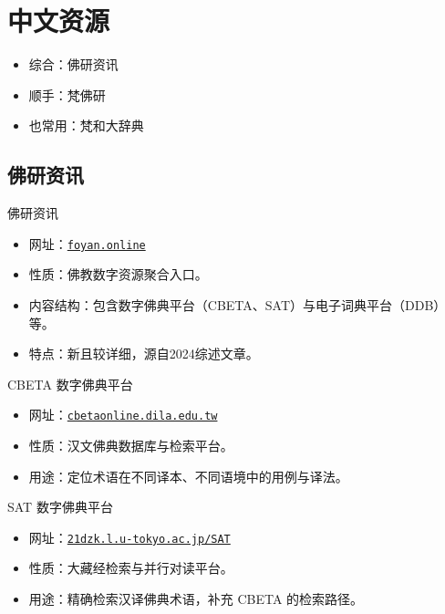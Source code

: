 \documentclass[17pt]{beamer}
\newcommand{\dicturl}[2]{\href{#1}{\mbox{\texttt{#2}}}}
\begin{document}
\section{中文资源}

\begin{frame}{\insertsection }
  \begin{itemize}
    \item 综合：佛研资讯
    \item 顺手：梵佛研
    \item 也常用：梵和大辞典
  \end{itemize}
\end{frame}

\subsection{佛研资讯}
\begin{frame}{佛研资讯}
  \small
  \begin{itemize}
    \item 网址：\dicturl{https://foyan.online/}{foyan.online}
    \item 性质：佛教数字资源聚合入口。
    \item 内容结构：包含数字佛典平台（CBETA、SAT）与电子词典平台（DDB）等。
    \item 特点：新且较详细，源自2024综述文章。
  \end{itemize}
\end{frame}

\begin{frame}{CBETA 数字佛典平台}
  \small
  \begin{itemize}
    \item 网址：\dicturl{https://cbetaonline.dila.edu.tw/}{cbetaonline.dila.edu.tw}
    \item 性质：汉文佛典数据库与检索平台。
    \item 用途：定位术语在不同译本、不同语境中的用例与译法。
  \end{itemize}
\end{frame}

\begin{frame}{SAT 数字佛典平台}
  \small
  \begin{itemize}
    \item 网址：\dicturl{https://21dzk.l.u-tokyo.ac.jp/SAT/}{21dzk.l.u-tokyo.ac.jp/SAT}
    \item 性质：大藏经检索与并行对读平台。
    \item 用途：精确检索汉译佛典术语，补充 CBETA 的检索路径。
  \end{itemize}
\end{frame}
\end{document}
